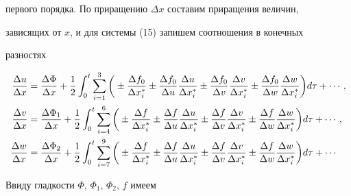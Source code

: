 первого порядка. По приращению $\Delta x$ составим приращения величин, 


зависящих от $x$, и для системы (15) запишем соотношения в конечных 


разностях 


\begin{align} 


\frac{\Delta u}{\Delta x}&=\frac{\Delta\Phi}{\Delta x}+ 


\frac{1}{2}\int^t_0\sum^3_{i=1}\bigg(\pm 


\frac{\Delta f_0}{\Delta x^*_i}\pm 


\frac{\Delta f_0}{\Delta u}\frac{\Delta u}{\Delta x^*_i}\pm 


\frac{\Delta f_0}{\Delta v}\frac{\Delta v}{\Delta x^*_i}\pm 


\frac{\Delta f_0}{\Delta w}\frac{\Delta w}{\Delta x^*_i} 


\bigg)d\tau+\dotsb,\notag \\ 


% 


\frac{\Delta v}{\Delta x}&=\frac{\Delta\Phi_1}{\Delta x}+ 


\frac{1}{2}\int^t_0\sum^6_{i=4}\bigg(\pm 


\frac{\Delta f}{\Delta x^*_i}\pm 


\frac{\Delta f}{\Delta u}\frac{\Delta u}{\Delta x^*_i}\pm 


\frac{\Delta f}{\Delta v}\frac{\Delta v}{\Delta x^*_i}\pm 


\frac{\Delta f}{\Delta w}\frac{\Delta w}{\Delta x^*_i} 


\bigg)d\tau+\dotsb,\\


% 


\frac{\Delta w}{\Delta x}&=\frac{\Delta\Phi_2}{\Delta x}+ 


\frac{1}{2}\int^t_0\sum^9_{i=7}\bigg(\pm 


\frac{\Delta f}{\Delta x^*_i}\pm 


\frac{\Delta f}{\Delta u}\frac{\Delta u}{\Delta x^*_i}\pm 


\frac{\Delta f}{\Delta v}\frac{\Delta v}{\Delta x^*_i}\pm 


\frac{\Delta f}{\Delta w}\frac{\Delta w}{\Delta x^*_i} 


\bigg)d\tau+\dotsb\notag 


\end{align} 


Ввиду гладкости $\Phi$, $\Phi_1$, $\Phi_2$, $f$ имеем 


